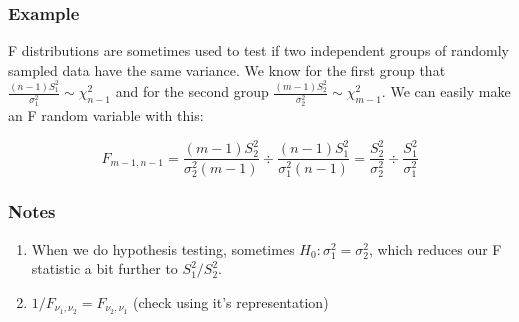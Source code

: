 \documentclass{beamer}
\begin{document}

\begin{frame}
\frametitle{Example}

F distributions are sometimes used to test if two independent groups of randomly sampled data have the same variance. We know for the first group that $\frac{(n-1)S_1^2}{\sigma_1^2} \sim \chi^2_{n-1}$ and for the second group $\frac{(m-1)S_2^2}{\sigma_2^2} \sim \chi^2_{m-1}$. We can easily make an F random variable with this:

\[
F_{m-1, n-1} =  \frac{(m-1)S_2^2}{\sigma_2^2 (m-1) } \div \frac{(n-1)S_1^2}{\sigma_1^2 (n-1) } = \frac{S_2^2}{\sigma_2^2 } \div \frac{S_1^2}{\sigma_1^2}
\]



\end{frame}


\begin{frame}
\frametitle{Notes}

\begin{enumerate}
\item When we do hypothesis testing, sometimes $H_0: \sigma_1^2 = \sigma_2^2$, which reduces our F statistic a bit further to $S_1^2 / S_2^2$. 
\item $1/F_{\nu_1, \nu_2} = F_{\nu_2, \nu_1}$ (check using it's representation)
\end{enumerate}
\end{frame}
\end{document}

